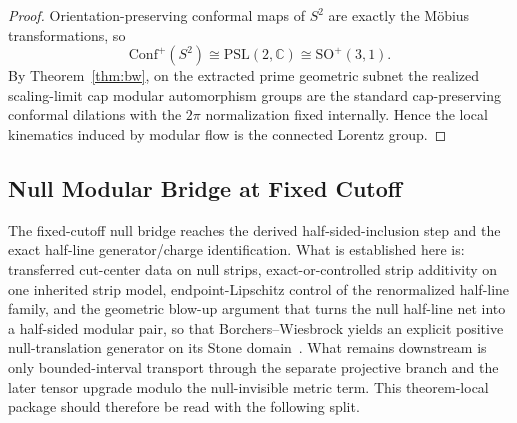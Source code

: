 \begin{proof}
Orientation-preserving conformal maps of \(S^2\) are exactly the M\"obius transformations, so
\[
\mathrm{Conf}^+(S^2)\cong \mathrm{PSL}(2,\mathbb C)\cong \mathrm{SO}^+(3,1).
\]
By Theorem~\ref{thm:bw}, on the extracted prime geometric subnet the realized scaling-limit cap modular automorphism groups are the standard cap-preserving conformal dilations with the \(2\pi\) normalization fixed internally. Hence the local kinematics induced by modular flow is the connected Lorentz group.
\end{proof}
\subsection{Null Modular Bridge at Fixed Cutoff}\label{23-null-modular-bridge-eft-conditions-n1-n3}

The fixed-cutoff null bridge reaches the derived half-sided-inclusion step and the exact half-line generator/charge identification. What is established here is: transferred cut-center data on null strips, exact-or-controlled strip additivity on one inherited strip model, endpoint-Lipschitz control of the renormalized half-line family, and the geometric blow-up argument that turns the null half-line net into a half-sided modular pair, so that Borchers--Wiesbrock yields an explicit positive null-translation generator on its Stone domain~\cite{wiesbrock93}. What remains downstream is only bounded-interval transport through the separate projective branch and the later tensor upgrade modulo the null-invisible metric term. This theorem-local package should therefore be read with the following split.

